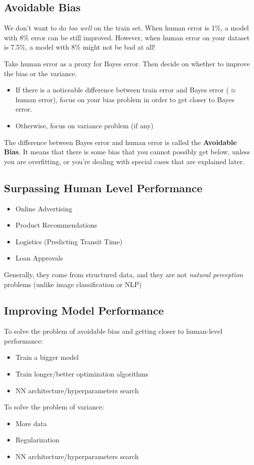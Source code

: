 \subsection{Avoidable Bias}
We don't want to do \emph{too well} on the train set. 
When human error is 1\%, a model with 8\% error can be still improved. 
However, when human error on your dataset is 7.5\%, a model with 8\% might not be bad at all!

Take human error as a proxy for Bayes error. Then decide on whether to improve the bias or the variance. 
\begin{itemize}
    \item If there is a noticeable difference between train error and Bayes error ($\approx$ human error), focus on your bias problem in order to get closer to Bayes error.
    \item Otherwise, focus on variance problem (if any)
\end{itemize}

The difference between Bayes error and human error is called the \textbf{Avoidable Bias}. 
It means that there is some bias that you cannot possibly get below, unless you are overfitting, or you're dealing with special cases that are explained later. 

\subsection{Surpassing Human Level Performance}
\begin{itemize}
    \item Online Advertising
    \item Product Recommendations
    \item Logistics (Predicting Transit Time)
    \item Loan Approvals
\end{itemize}

Generally, they come from structured data, and they are not \emph{natural perception} problems (unlike image classification or NLP)

\subsection{Improving Model Performance}
To solve the problem of avoidable bias and getting closer to human-level performance: 
\begin{itemize}
    \item Train a bigger model
    \item Train longer/better optimization algorithms
    \item NN architecture/hyperparameters search 
\end{itemize}

To solve the problem of variance: 
\begin{itemize}
    \item More data
    \item Regularization
    \item NN architecture/hyperparameters search
\end{itemize}
